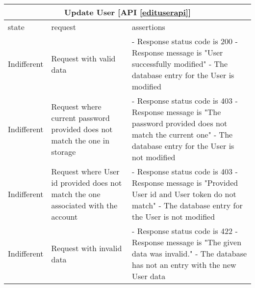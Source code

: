 \begin{center}
	\begin{tabular}{|p{}|p{}|p{}|}
		\hline
		\multicolumn{3}{c}{Update User [API \ref{edituserapi}]}\\
		
		\hline
		state & request & assertions \\
		
		
		\hline
		Indifferent &
		Request with valid data & 
		- Response status code is 200 \newline
		- Response message is "User successfully modified" \newline
		- The database entry for the User is modified
		\\
		
		\hline
		Indifferent  &
		Request where current password provided does not match the one in storage & 
		- Response status code is 403 \newline
		- Response message is "The password provided does not match the current one" \newline
		- The database entry for the User is not modified
		\\
		
		
		\hline
		Indifferent  &
		Request where User id provided does not match the one associated with the account & 
		- Response status code is 403 \newline
		- Response message is "Provided User id and User token do not match" \newline
		- The database entry for the User is not modified
		\\

		\hline
		Indifferent  &
		Request with invalid data & 
		- Response status code is 422 \newline
		- Response message is "The given data was invalid." \newline
		- The database has not an entry with the new User data
		\\
		
		
		\hline
		
	\end{tabular}
\end{center}


